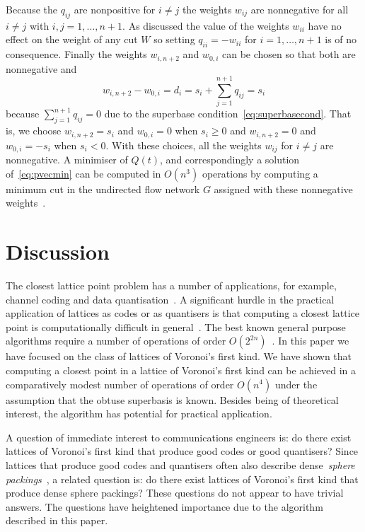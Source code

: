 \documentclass[final,leqno]{siamltex}
\begin{document}
Because the $q_{ij}$ are nonpositive for $i \neq j$ the weights $w_{ij}$ are nonnegative for all $i \neq j$ with $i,j = 1,\dots,n+1$.  As discussed the value of the weights $w_{ii}$ have no effect on the weight of any cut $W$ so setting $q_{ii} = - w_{ii}$ for  $i = 1,\dots,n+1$ is of no consequence.  Finally the weights $w_{i,n+2}$ and $w_{0,i}$ can be chosen so that both are nonnegative and 
\[
w_{i,n+2} - w_{0,i} = d_i = s_i + \sum_{j=1}^{n+1} q_{ij} = s_i
\]  
because $\sum_{j=1}^{n+1} q_{ij} = 0$ due to the superbase condition~\eqref{eq:superbasecond}.  That is, we choose $w_{i,n+2} = s_i$ and $w_{0,i} = 0$ when $s_i \geq 0$ and $w_{i,n+2}=0$ and $w_{0,i} = -s_i$ when $s_i < 0$.  With these choices, all the weights $w_{ij}$ for $i \neq j$ are nonnegative.  A minimiser of $Q(t)$, and correspondingly a solution of~\eqref{eq:pvecmin} can be computed in $O(n^3)$ operations by computing a minimum cut in the undirected flow network $G$ assigned with these nonnegative weights~\cite{Picard_min_cuts_1974,Sankaran_solving_CDMA_mincut_1998,Ulukus_cdma_mincut_1998,Cormen2001}.  %


\section{Discussion}\label{sec:discussion} 

The closest lattice point problem has a number of applications, for example, channel coding and data quantisation~\cite{Conway1983VoronoiCodes,Conway1982VoronoiRegions,Conway1982FastQuantDec,Erex2004_lattice_decoding,Erez2005}.  A significant hurdle in the practical application of lattices as codes or as quantisers is that computing a closest lattice point is computationally difficult in general~\cite{micciancio_hardness_2001}.  The best known general purpose algorithms require a number of operations of order $O(2^{2n})$~\cite{MicciancioVoulgaris_deterministic_jv_2013}.  In this paper we have focused on the class of lattices of Voronoi's first kind.  We have shown that computing a closest point in a lattice of Voronoi's first kind can be achieved in a comparatively modest number of operations of order $O(n^4)$ under the assumption that the obtuse superbasis is known.  Besides being of theoretical interest, the algorithm has potential for practical application.

A question of immediate interest to communications engineers is: do there exist lattices of Voronoi's first kind that produce good codes or good quantisers?  Since lattices that produce good codes and quantisers often also describe dense~\emph{sphere packings}~\cite{SPLAG}, a related question is: do there exist lattices of Voronoi's first kind that produce dense sphere packings?  These questions do not appear to have trivial answers.  The questions have heightened importance due to the algorithm described in this paper.
\end{document}
